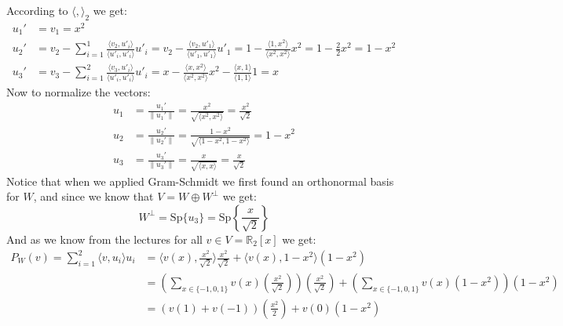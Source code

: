 \documentclass[11pt,a4paper]{article}
\theoremstyle{plain}
\newcommand{\Sp}{\text{Sp}}
\newcommand{\R}{\mathbb{R}}
\begin{document}
	\newpage
	
	According to $\langle ,\rangle_2$ we get:
	\begin{align*}
		u_1' &= v_1 = x^2 \\
		u_2' &= v_2 - \sum_{i=1}^{1}
		{\frac{\langle v_2,u'_i\rangle}{\langle u'_i,u'_i\rangle}u'_i} = 
		v_2 - \frac{\langle v_2,u'_1\rangle}{\langle u'_1,u'_1\rangle} u'_1 = 
		1 - \frac{\langle 1,x^2\rangle}{\langle x^2,x^2\rangle} x^2 = 
		1 - \frac{2}{2} x^2 = 1 - x^2 \\
		u_3' &= v_3 - \sum_{i=1}^{2}
		{\frac{\langle v_3,u'_i\rangle}{\langle u'_i,u'_i\rangle}u'_i} = 
		x - \frac{\langle x,x^2\rangle}{\langle x^2,x^2\rangle}x^2 - 
		\frac{\langle x,1\rangle}{\langle 1,1\rangle}1 = 
		x
	\end{align*}
	Now to normalize the vectors:
	\begin{align*}
		u_1 &= \frac{u_1'}{\|u_1'\|} = 
		\frac{x^2}{\sqrt{\langle x^2,x^2\rangle}} = 
		\frac{x^2}{\sqrt{2}}
		\\
		u_2 &= \frac{u_2'}{\|u_2'\|} = 
		\frac{1 - x^2}{\sqrt{\langle 1 - x^2,1 - x^2\rangle}} = 
		1-x^2
		\\
		u_3 &= \frac{u_3'}{\|u_3'\|} = 
		\frac{x}{\sqrt{\langle x, x\rangle}} = 
		\frac{x}{\sqrt{2}}
	\end{align*}
	Notice that when we applied Gram-Schmidt we first found an orthonormal basis
	for $W$, and since we know that $V = W \oplus W^\bot$ we get:
	\[ W^\bot = \Sp\{u_3\} = \Sp\left\{\frac{x}{\sqrt{2}}\right\} \]
	And as we know from the lectures for all $v\in V = \R_2[x]$ we get:
	\begin{align*}
		P_W(v) = \sum_{i=1}^{2}{\langle v,u_i \rangle u_i} &= 
		\langle v(x),\frac{x^2}{\sqrt{2}} \rangle \frac{x^2}{\sqrt{2}} + 
		\langle v(x),1-x^2 \rangle \left(1-x^2\right) \\ &= 
		\left(\sum_{x\in\{-1,0,1\}}
		{v(x)\left(\frac{x^2}{\sqrt{2}}\right)}\right)
		\left(\frac{x^2}{\sqrt{2}}\right) + 
		\left(\sum_{x\in\{-1,0,1\}}{v(x)(1-x^2)}\right)\left(1-x^2\right) \\ &= 
		\left(v(1)+v(-1)\right)\left(\frac{x^2}{2}\right) + v(0)
		\left(1-x^2\right)
	\end{align*}
	
	\newpage
\end{document}
